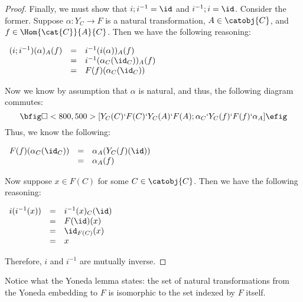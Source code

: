\begin{proof}
  Finally, we must show that $i;i^{-1} = \id$ and $i^{-1};i = \id$.
  Consider the former.  Suppose $\alpha : Y_C \to F$ is a natural
  transformation, $A \in \catobj{C}$, and $f \in \Hom{\cat{C}}{A}{C}$.  Then we
  have the following reasoning:
  \begin{center}
    \begin{math}
      \begin{array}{lll}
        (i;i^{-1})(\alpha)_{A}(f)
        & = & i^{-1}(i(\alpha))_{A}(f)\\
        & = & i^{-1}(\alpha_C(\id_C))_A(f)\\
        & = & F(f)(\alpha_C(\id_C))\\
      \end{array}
    \end{math}
  \end{center}
  Now we know by assumption that $\alpha$ is natural, and thus, the
  following diagram commutes:
  \[
  \bfig
  \square<800,500>[Y_C(C)`F(C)`Y_C(A)`F(A);\alpha_C`Y_C(f)`F(f)`\alpha_A]
  \efig
  \]
  Thus, we know the following:
  \begin{center}
    \begin{math}
      \begin{array}{lll}
        F(f)(\alpha_C(\id_C))
        & = & \alpha_A(Y_C(f)(\id))\\
        & = & \alpha_A(f)\\
      \end{array}
    \end{math}
  \end{center}
  Now suppose $x \in F(C)$ for some $C \in \catobj{C}$.  Then we have
  the following reasoning:
  \begin{center}
    \begin{math}
      \begin{array}{lll}
        i(i^{-1}(x))
        & = & i^{-1}(x)_C(\id)\\
        & = & F(\id)(x)\\
        & = & \id_{F(C)}(x)\\
        & = & x\\
      \end{array}
    \end{math}
  \end{center}
  Therefore, $i$ and $i^{-1}$ are mutually inverse.
\end{proof}
Notice what the Yoneda lemma states: the set of natural
transformations from the Yoneda embedding to $F$ is isomorphic to the
set indexed by $F$ itself.

